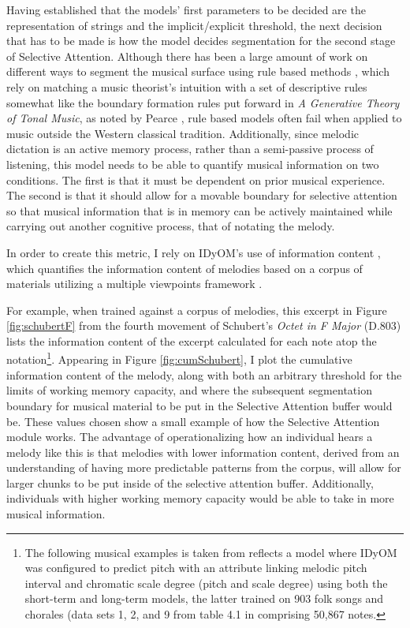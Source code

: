 \documentclass[12pt,]{book}
\let\rmarkdownfootnote\footnote%
\def\footnote{\protect\rmarkdownfootnote}
\begin{document}
Having established that the models' first parameters to be decided are the representation of strings and the implicit/explicit threshold, the next decision that has to be made is how the model decides segmentation for the second stage of Selective Attention.
Although there has been a large amount of work on different ways to segment the musical surface using rule based methods \citep{lerdahlGenerativeTheoryTonal1986, margulisModelMelodicExpectation2005, narmourAnalysisCognitionBasic1990, narmourAnalysisCognitionMelodic1992}, which rely on matching a music theorist's intuition with a set of descriptive rules somewhat like the boundary formation rules put forward in \emph{A Generative Theory of Tonal Music}, as noted by Pearce \citep{pearceStatisticalLearningProbabilistic2018a}, rule based models often fail when applied to music outside the Western classical tradition.
Additionally, since melodic dictation is an active memory process, rather than a semi-passive process of listening, this model needs to be able to quantify musical information on two conditions.
The first is that it must be dependent on prior musical experience.
The second is that it should allow for a movable boundary for selective attention so that musical information that is in memory can be actively maintained while carrying out another cognitive process, that of notating the melody.

In order to create this metric, I rely on IDyOM's use of information content \citep{shannonMathematicalTheoryCommunication1948}, which quantifies the information content of melodies based on a corpus of materials utilizing a multiple viewpoints framework \citep{conklinMultipleViewpointSystems1995}.

For example, when trained against a corpus of melodies, this excerpt in Figure \ref{fig:schubertF} from the fourth movement of Schubert's \emph{Octet in F Major} (D.803) lists the information content of the excerpt calculated for each note atop the notation\footnote{The following musical examples is taken from \citet{pearceStatisticalLearningProbabilistic2018a} reflects a model where IDyOM was configured to predict pitch with an attribute linking melodic pitch interval and chromatic scale degree (pitch and scale degree) using both the short-term and long-term models, the latter trained on 903 folk songs and chorales (data sets 1, 2, and 9 from table 4.1 in \citep{schaffrathEssenFolkSong1995} comprising 50,867 notes.}.
Appearing in Figure \ref{fig:cumSchubert}, I plot the cumulative information content of the melody, along with both an arbitrary threshold for the limits of working memory capacity, and where the subsequent segmentation boundary for musical material to be put in the Selective Attention buffer would be.
These values chosen show a small example of how the Selective Attention module works.
The advantage of operationalizing how an individual hears a melody like this is that melodies with lower information content, derived from an understanding of having more predictable patterns from the corpus, will allow for larger chunks to be put inside of the selective attention buffer.
Additionally, individuals with higher working memory capacity would be able to take in more musical information.
\end{document}
